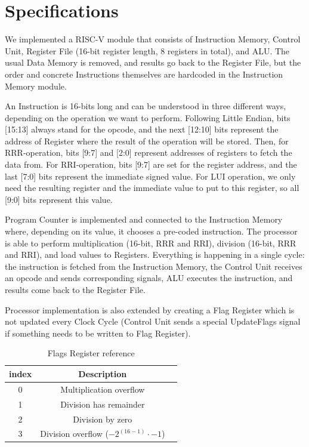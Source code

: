 \section{Specifications}
We implemented a RISC-V module that consists of Instruction Memory, Control Unit, Register File (16-bit register length, 8 registers in total), and ALU. The usual Data Memory is removed, and results go back to the Register File, but the order and concrete Instructions themselves are hardcoded in the Instruction Memory module.

An Instruction is 16-bits long and can be understood in three different ways, depending on the operation we want to perform. Following Little Endian, bits [15:13] always stand for the opcode, and the next [12:10] bits represent the address of Register where the result of the operation will be stored. Then, for RRR-operation, bits [9:7] and [2:0] represent addresses of registers to fetch the data from. For RRI-operation, bits [9:7] are set for the register address, and the last [7:0] bits represent the immediate signed value. For LUI operation, we only need the resulting register and the immediate value to put to this register, so all [9:0] bits represent this value.

Program Counter is implemented and connected to the Instruction Memory where, depending on its value, it chooses a pre-coded instruction. The processor is able to perform multiplication (16-bit, RRR and RRI), division (16-bit, RRR and RRI), and load values to Registers. Everything is happening in a single cycle: the instruction is fetched from the Instruction Memory, the Control Unit receives an opcode and sends corresponding signals, ALU executes the instruction, and results come back to the Register File.

Processor implementation is also extended by creating a Flag Register which is not updated every Clock Cycle (Control Unit sends a special UpdateFlags signal if something needs to be written to Flag Register). 
\begin{table}[h] %
    \centering
    \caption{Flags Register reference}
    \label{tab:flags}
    \begin{tabular}{ccc} %
        \toprule %
        index & Description  \\
        \midrule %
        0 & Multiplication overflow \\
        1 & Division has remainder \\
        2 & Division by zero \\
        3 & Division overflow ($-2^{(16-1)} \cdot -1$) \\
        \bottomrule %
    \end{tabular}
\end{table}